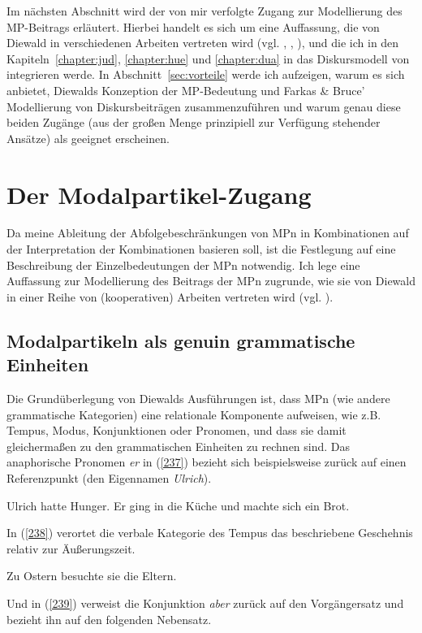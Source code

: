 \noindent
Im nächsten Abschnitt wird der von mir verfolgte Zugang zur Modellierung des MP-Beitrags erläutert. Hierbei handelt es sich um eine Auffassung, die von Diewald in verschiedenen Arbeiten vertreten wird (vgl. \citealt{Diewald1997, Diewald2006, Diewald2007}, \citealt{Diewald1998}, \citealt{Diewald2010}), und die ich in den Kapiteln~\ref{chapter:jud}, \ref{chapter:hue} und \ref{chapter:dua} in das Diskursmodell von \citet{Farkas2010} integrieren werde. In Abschnitt~\ref{sec:vorteile} werde ich aufzeigen, warum es sich anbietet, Diewalds Konzeption der MP-Bedeutung und Farkas \& Bruce'  Modellierung von Diskursbeiträgen zusammenzuführen und warum genau diese beiden Zugänge (aus der großen Menge prinzipiell zur Verfügung stehender Ansätze) als geeignet erscheinen.

\section{Der Modalpartikel-Zugang}
\label{sec:zugang}
Da meine Ableitung der Abfolgebeschränkungen von MPn in Kombinationen auf der Interpretation der Kombinationen basieren soll, ist die Festlegung auf eine Beschreibung der Einzelbedeutungen der MPn notwendig. Ich lege eine Auffassung zur Modellierung des Beitrags der MPn zugrunde, wie sie von Diewald in einer Reihe von (kooperativen) Arbeiten vertreten wird (vgl. \citealt{Diewald1997, Diewald1999a, Diewald2006, Diewald2007, Diewald1998, Diewald2010}). 

\subsection{Modalpartikeln als genuin grammatische Einheiten}
Die Grundüberlegung von Diewalds Ausführungen ist, dass MPn (wie andere grammatische Kategorien) eine relationale Komponente aufweisen, wie z.B. Tempus, Modus, Konjunktionen oder Pronomen, und dass sie damit gleichermaßen zu den grammatischen Einheiten zu rechnen sind. Das anaphorische Pronomen  \textit{er} in (\ref{237}) bezieht sich beispielsweise zurück auf einen Referenzpunkt (den Eigennamen \textit{Ulrich}).
	
\begin{exe}
	\ex\label{237} 
	Ulrich hatte Hunger. Er ging in die Küche und machte sich ein Brot.
\end{exe}	
In (\ref{238}) verortet die verbale Kategorie des Tempus  das beschriebene Geschehnis relativ zur Äußerungszeit. 

\begin{exe}
	\ex\label{238} 
	Zu Ostern besuchte sie die Eltern.
\end{exe}
Und in (\ref{239}) verweist die Konjunktion  \textit{aber} zurück auf den Vorgängersatz und bezieht ihn auf den folgenden Nebensatz.

